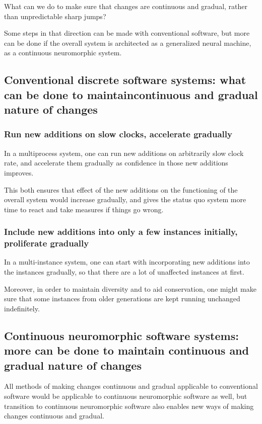 \documentclass{article}
\begin{document}
What can we do to make sure that changes are continuous and gradual, rather than unpredictable sharp jumps?

Some steps in that direction can be made with conventional software, but more can be done if the overall
system is architected as a generalized neural machine, as a continuous neuromorphic system.

\subsection{Conventional discrete software systems: what can be done to maintain\linebreak continuous and gradual nature of changes}

\subsubsection{Run new additions on slow clocks, accelerate gradually}\label{sec:slowdown}

In a multiprocess system, one can run new additions on arbitrarily slow clock rate, and accelerate them gradually as confidence
in those new additions improves.

This both ensures that effect of the new additions on the functioning of the overall system would increase gradually,
and gives the status quo system more time to react and take measures if things go wrong.

\subsubsection{Include new additions into only a few instances initially, proliferate gradually}

In a multi-instance system, one can start with incorporating new additions into the instances gradually, so that there are a lot
of unaffected instances at first.

Moreover, in order to maintain diversity and to aid conservation, one might make sure that some instances from older
generations are kept running unchanged indefinitely. 

\subsection{Continuous neuromorphic software systems: more can be done to maintain continuous and gradual nature of changes}\label{sec:dataflow}

All methods of making changes continuous and gradual applicable to conventional software would be applicable to
continuous neuromorphic software as well, but transition to continuous neuromorphic software also enables new
ways of making changes continuous and gradual.
\end{document}
